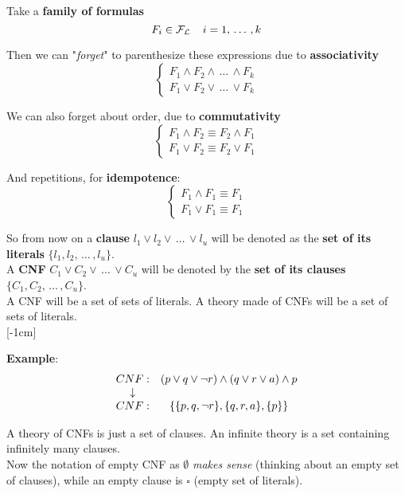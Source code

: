 Take a \textbf{family of formulas}
$$ F_i \in \mathcal{F}_\mathcal{L} \;\;\;\; i = 1, \, \dots \, , k $$

Then we can "\textit{forget}" to parenthesize these expressions due to \textbf{associativity}
$$ 
\begin{cases}
	F_1 \wedge F_2 \wedge \, \dots \, \wedge F_k \\
	F_1 \vee F_2 \vee \, \dots \, \vee F_k
\end{cases}
$$

We can also forget about order, due to \textbf{commutativity}
$$
\begin{cases}
	F_1 \wedge F_2 \equiv F_2 \wedge F_1  \\
	F_1 \vee F_2 \equiv F_2 \vee F_1 
\end{cases}
$$

And repetitions, for \textbf{idempotence}:
$$ 
\begin{cases}
	F_1 \wedge F_1 \equiv F_1 \\
	F_1 \vee F_1 \equiv F_1
\end{cases}
$$

So from now on a \textbf{clause} $l_1 \vee l_2 \vee \, \dots \, \vee l_u$ will be denoted as the \textbf{set of its literals} $\{l_1, l_2, \, \dots \, , l_u\}$.\\
A \textbf{CNF} $C_1 \vee C_2 \vee \, \dots \, \vee C_u$ will be denoted by the \textbf{set of its clauses}  $\{C_1, C_2, \, \dots \, , C_u\}$.\\

A CNF will be a set of sets of literals. A theory made of CNFs will be a set of sets of literals.\\

[-1cm]

\textbf{Example}:
$$
\begin{array}{c c}
	CNF: & (p \vee q \vee \neg r) \wedge (q \vee r \vee a) \wedge p \\
	\downarrow & \\
	CNF: & \left\{\{p, q, \neg r\}, \{q,r,a\}, \{p\}\right\} 
\end{array}
$$

A theory of CNFs is just a set of clauses. An infinite theory is a set containing infinitely many clauses.\\

Now the notation of empty CNF as $\emptyset$ \textit{makes sense} (thinking about an empty set of clauses), while an empty clause is $\square$ (empty set of literals).\\


